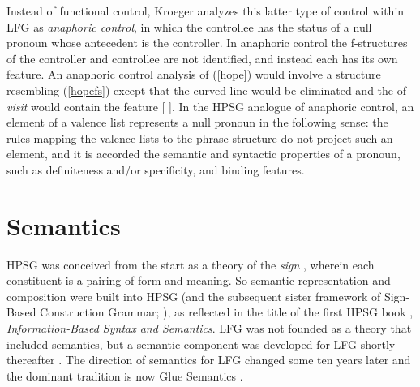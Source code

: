 Instead of functional control, Kroeger analyzes this latter type of control with\-in LFG as \textit{anaphoric control}, in which the controllee has the status of a null pronoun whose antecedent is the controller.  In anaphoric control the f-structures of the controller and controllee are not identified, and instead each has its own  feature.  An anaphoric control analysis of (\ref{hope}) would involve a structure resembling (\ref{hopefs}) except that the curved line would be eliminated and the  of \textit{visit} would contain the feature [ ].  In the HPSG analogue of anaphoric control, an element of a valence list represents a null pronoun in the following sense:  the rules mapping the valence lists to the phrase structure do not project such an element, and it is accorded the semantic and syntactic properties of a pronoun, such as definiteness and/or specificity, and binding features.  

\section{Semantics}


HPSG  was conceived from the
start as  a theory of the \textit{sign} \citep{Saussure16a-Fr}, 
wherein each constituent is a pairing of form and meaning.  
So semantic representation and composition  were built into HPSG (and the subsequent sister framework of Sign-Based Construction Grammar; \citealt{BS2012a-ed}), as reflected in the title of the first HPSG
book \citep{pollard;sag87}, \textit{Information-Based Syntax and
  Semantics}.  LFG was not founded as a theory that included semantics, but a semantic component was developed for LFG shortly thereafter \citep{halvorsen83}.  The direction of semantics for LFG changed some ten years later and the dominant tradition is now Glue Semantics \citep{dalrymple;ea93,dalrymple99,Dalrymple2001a-u,asudeh-lpr,dalrymple;ea19}.  

